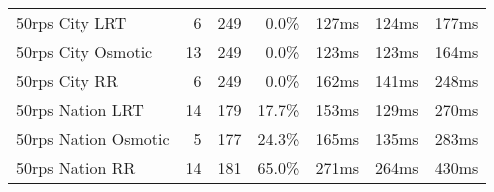 \begin{table}[]
\begin{tabular}{lrrrrrr}
50rps City LRT       & 6                                                              & 249                                                                                       & 0.0\%                                                                         & 127ms                                                       & 124ms                                                         & 177ms                                                      \\
50rps City Osmotic   & 13                                                             & 249                                                                                       & 0.0\%                                                                         & 123ms                                                       & 123ms                                                         & 164ms                                                      \\
50rps City RR        & 6                                                              & 249                                                                                       & 0.0\%                                                                         & 162ms                                                       & 141ms                                                         & 248ms                                                      \\ \hline
50rps Nation LRT     & 14                                                             & 179                                                                                       & 17.7\%                                                                        & 153ms                                                       & 129ms                                                         & 270ms                                                      \\
50rps Nation Osmotic & 5                                                              & 177                                                                                       & 24.3\%                                                                        & 165ms                                                       & 135ms                                                         & 283ms                                                      \\
50rps Nation RR      & 14                                                             & 181                                                                                       & 65.0\%                                                                        & 271ms                                                       & 264ms                                                         & 430ms                                                      \\ \hline

\end{tabular}
\end{table}
